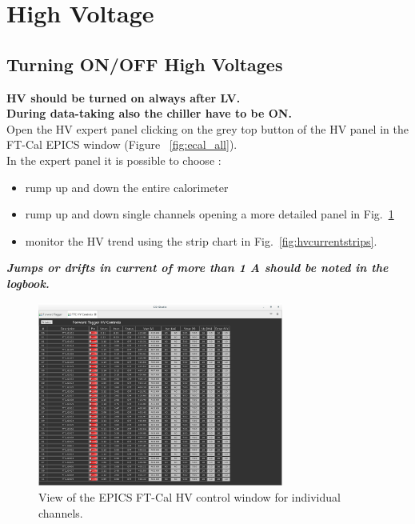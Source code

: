 \documentclass[11.5pt]{article}
\begin{document}
\section{High Voltage}\label{sec:ft-hv}
\subsection{Turning ON/OFF High Voltages}
\textbf{HV should be turned on always after LV. \\
During data-taking also the chiller have to be ON.\\} 
Open the HV expert panel clicking on the grey top button of the HV panel in the FT-Cal
EPICS window (Figure ~\ref{fig:ecal_all}).\\
In the expert panel it is possible to choose :
\begin{itemize}
\item rump up and down the entire calorimeter
\item rump up and down single channels opening a more detailed panel in Fig.~\ref{fig:HVControl}
\item monitor the HV trend using the strip chart in Fig.~\ref{fig:hvcurrentstrips}.
\end{itemize}
\textit{\textbf{ Jumps or drifts in current of more than 1 A should be noted in the logbook.}}\\
\begin{figure}[ht]
\center
\includegraphics[width=0.72\textwidth]{pics/FTC_HV_controls_expert.png}
\caption{ \label{fig:HVControl} View of the EPICS FT-Cal HV control window for individual channels.}
\end{figure}
\end{document}
